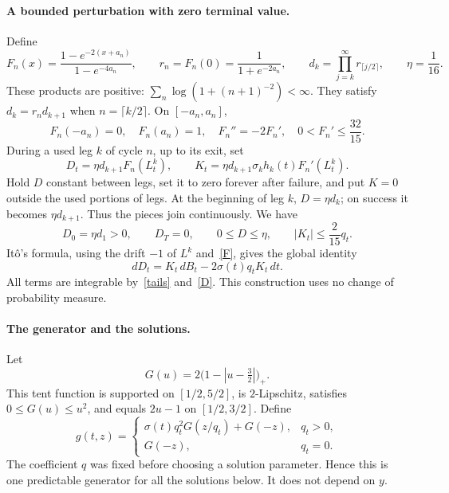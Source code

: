 \documentclass[11pt]{article}
\begin{document}
\paragraph{A bounded perturbation with zero terminal value.}
Define
\[
 F_n(x)=\frac{1-e^{-2(x+a_n)}}{1-e^{-4a_n}},\qquad
 r_n=F_n(0)=\frac1{1+e^{-2a_n}},\qquad
 d_k=\prod_{j=k}^{\infty}r_{\lceil j/2\rceil},\qquad \eta=\frac1{16}.
\]
These products are positive: $\sum_n\log(1+(n+1)^{-2})<\infty$. They satisfy $d_k=r_n d_{k+1}$ when $n=\lceil k/2\rceil$. On $[-a_n,a_n]$,
\begin{equation}\label{F}
 F_n(-a_n)=0,\quad F_n(a_n)=1,\quad
 F_n''=-2F_n',\quad 0<F_n'\leq\frac{32}{15}.
\end{equation}
During a used leg $k$ of cycle $n$, up to its exit, set
\[
 D_t=\eta d_{k+1}F_n(L^k_t),\qquad
 K_t=\eta d_{k+1}\sigma_k h_k(t)F_n'(L^k_t).
\]
Hold $D$ constant between legs, set it to zero forever after failure, and put $K=0$ outside the used portions of legs. At the beginning of leg $k$, $D=\eta d_k$; on success it becomes $\eta d_{k+1}$. Thus the pieces join continuously. We have
\begin{equation}\label{D}
 D_0=\eta d_1>0,\qquad D_T=0,\qquad
 0\leq D\leq\eta,\qquad |K_t|\leq\frac{2}{15}q_t.
\end{equation}
It\^o's formula, using the drift $-1$ of $L^k$ and~\eqref{F}, gives the global identity
\begin{equation}\label{linear}
 dD_t=K_t\,dB_t-2\sigma(t)q_tK_t\,dt.
\end{equation}
All terms are integrable by~\eqref{tails} and~\eqref{D}. This construction uses no change of probability measure.

\paragraph{The generator and the solutions.}
Let
\[
 G(u)=2\bigl(1-|u-\tfrac32|\bigr)_+.
\]
This tent function is supported on $[1/2,5/2]$, is $2$-Lipschitz, satisfies $0\leq G(u)\leq u^2$, and equals $2u-1$ on $[1/2,3/2]$. Define
\begin{equation}\label{generator}
 g(t,z)=
 \begin{cases}
  \sigma(t)q_t^2G(z/q_t)+G(-z),&q_t>0,\\
  G(-z),&q_t=0.
 \end{cases}
\end{equation}
The coefficient $q$ was fixed before choosing a solution parameter. Hence this is one predictable generator for all the solutions below. It does not depend on $y$.
\end{document}
